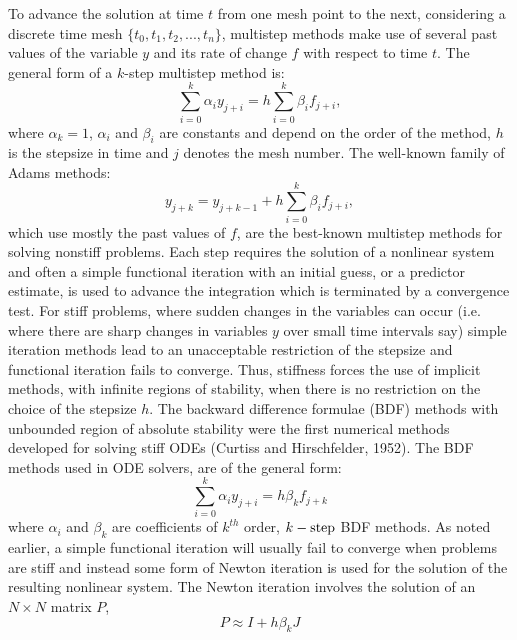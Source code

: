 To advance the solution at time $t$ from one mesh point to the next, considering
a discrete time mesh $\{t_0,t_1,t_2, ...,t_n\}$, multistep methods make use of
several past values of the variable $y$ and its rate of change $f$ with respect
to time $t$. The general form of a \mbox{$k$-step} multistep method is:
\begin{equation}\label{E:linde}
    \sum_{i=0}^k \alpha_i y_{j+i} = h \sum_{i=0}^k \beta_i f_{j+i},
\end{equation}
where $\alpha_k=1$, $\alpha_i$  and $\beta_i$  are constants and depend on the
order of the method, $h$ is the stepsize in time and $j$ denotes the mesh
number. The well-known family of Adams methods:
\begin{equation}\label{E:linde}
    y_{j+k} = y_{j+k-1} + h \sum_{i=0}^{k} \beta_i f_{j+i},
\end{equation}
which use mostly the past values of $f$, are the best-known multistep methods for
solving nonstiff problems. Each step requires the solution of a nonlinear system
and often a simple functional iteration with an initial guess, or a predictor
estimate, is used to advance the integration which is terminated by a
convergence test. For stiff problems, where sudden changes in the variables can
occur (i.e. where there are sharp changes in variables $y$ over small time
intervals say) simple iteration methods lead to an unacceptable restriction of
the stepsize and functional iteration fails to converge. Thus, stiffness forces
the use of implicit methods, with infinite regions of stability, when there is
no restriction on the choice of the stepsize $h$. The backward difference
formulae (BDF) methods with unbounded region of absolute stability were the
first numerical methods developed for solving stiff ODEs (Curtiss and
Hirschfelder, 1952). The BDF methods used in ODE solvers, are of the general
form:
\begin{equation}\label{E:linde}
    \sum_{i=0}^k \alpha_i y_{j+i}= h \beta_k f_{j+k}
\end{equation}
where $\alpha_i$  and $\beta_k$ are coefficients of $k^{th}$ order,
$k \rm -step$ BDF methods.  As noted earlier, a simple functional iteration will
usually fail to converge when problems are stiff and instead some form of Newton
iteration is used for the solution of the resulting nonlinear system. The Newton
iteration involves the solution of an $N \times N$ matrix $P$,
\begin{equation}\label{E:linde}
    P \approx I + h \beta_k J
\end{equation}


